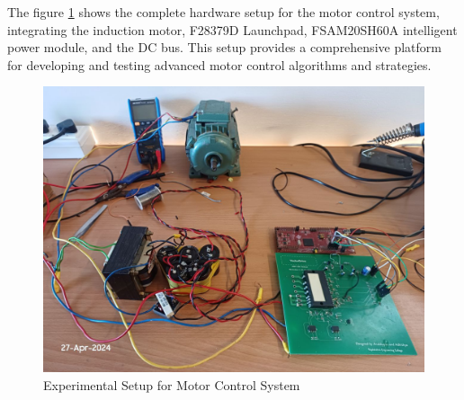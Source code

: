 
The figure \ref{fig:Complete Hardware Setup} shows the complete hardware setup for the motor control system, integrating the induction motor, F28379D Launchpad, FSAM20SH60A intelligent power module, and the DC bus. This setup provides a comprehensive platform for developing and testing advanced motor control algorithms and strategies.

\begin{figure}
	\centering
	\includegraphics[width=6in]{sections/section6/images/hardwareSetup/fullSetupWithMotorAndIPM.jpg}
	\caption{Experimental Setup for Motor Control System}
	\label{fig:Complete Hardware Setup}
\end{figure}
\newpage